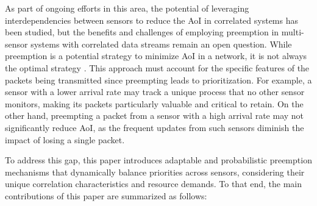 As part of ongoing efforts in this area, the potential of leveraging interdependencies between sensors to reduce the AoI in correlated systems has been studied, but the benefits and challenges of employing preemption in multi-sensor systems with correlated data streams remain an open question. While preemption is a potential strategy to minimize AoI in a network, it is not always the optimal strategy \cite{yates2019}. This approach must account for the specific features of the packets being transmitted since preempting leads to prioritization. For example, a sensor with a lower arrival rate may track a unique process that no other sensor monitors, making its packets particularly valuable and critical to retain. On the other hand, preempting a packet from a sensor with a high arrival rate may not significantly reduce AoI, as the frequent updates from such sensors diminish the impact of losing a single packet.




To address this gap, this paper introduces adaptable and probabilistic preemption mechanisms that dynamically balance priorities across sensors, considering their unique correlation characteristics and resource demands. To that end, the main contributions of this paper are summarized as follows:


